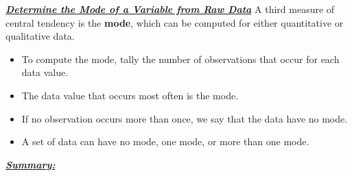\documentclass{report}
\begin{document}
         \bigbreak \noindent \bigbreak \noindent 
         \textbf{\textit{\underline{Determine the Mode of a Variable from Raw Data}}}
         \bigbreak \noindent 
         A third measure of central tendency is the \textbf{mode}, which can be computed for either quantitative or qualitative data.
         \begin{itemize}
             \item To compute the mode, tally the number of observations that occur for each data value.
             \item The data value that occurs most often is the mode.
             \item If no observation occurs more than once, we say that the data have no mode.
             \item A set of data can have no mode, one mode, or more than one mode.
         \end{itemize}

         \bigbreak \noindent \bigbreak \noindent 
         \textbf{\textit{\underline{Summary:}}}
         \bigbreak \noindent 
        \begin{figure}[h]
            \centering
            \label{fig:figure2}
        \end{figure}

        \pagebreak \bigbreak \noindent
\end{document}
